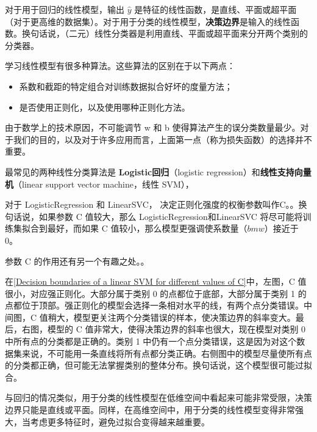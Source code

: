 对于用于回归的线性模型，输出 $\hat{y}$ 是特征的线性函数，是直线、平面或超平面（对于更高维的数据集）。对于用于分类的线性模型，\textbf{决策边界}是输入的线性函数。换句话说，（二元）线性分类器是利用直线、平面或超平面来分开两个类别的分类器。

学习线性模型有很多种算法。这些算法的区别在于以下两点：
\begin{itemize}
    \item 系数和截距的特定组合对训练数据拟合好坏的度量方法；
    \item 是否使用正则化，以及使用哪种正则化方法。
\end{itemize}

由于数学上的技术原因，不可能调节 w 和 b 使得算法产生的误分类数量最少。对于我们的目的，以及对于许多应用而言，上面第一点（称为损失函数）的选择并不重要。

最常见的两种线性分类算法是 \textbf{Logistic回归}（logistic regression）和\textbf{线性支持向量机}（linear support vector machine，线性 SVM），


对于 LogisticRegression 和 LinearSVC， 决定正则化强度的权衡参数叫作C。。换句话说，如果参数 C 值较大，那么 LogisticRegression和LinearSVC 将尽可能将训练集拟合到最好，而如果 C 值较小，那么模型更强调使系数量（$bm{w}$）接近于 0。

参数 C 的作用还有另一个有趣之处。。


在\autoref{Decision boundaries of a linear SVM for different values of C}中，左图，C 值很小，对应强正则化。大部分属于类别 0 的点都位于底部，大部分属于类别 1 的点都位于顶部。强正则化的模型会选择一条相对水平的线，有两个点分类错误。中间图，C 值稍大，模型更关注两个分类错误的样本，使决策边界的斜率变大。最后，右图，模型的 C 值非常大，使得决策边界的斜率也很大，现在模型对类别 0 中所有点的分类都是正确的。类别 1 中仍有一个点分类错误，这是因为对这个数据集来说，不可能用一条直线将所有点都分类正确。右侧图中的模型尽量使所有点的分类都正确，但可能无法掌握类别的整体分布。换句话说，这个模型很可能过拟合。

与回归的情况类似，用于分类的线性模型在低维空间中看起来可能非常受限，决策边界只能是直线或平面。同样，在高维空间中，用于分类的线性模型变得非常强大，当考虑更多特征时，避免过拟合变得越来越重要。

